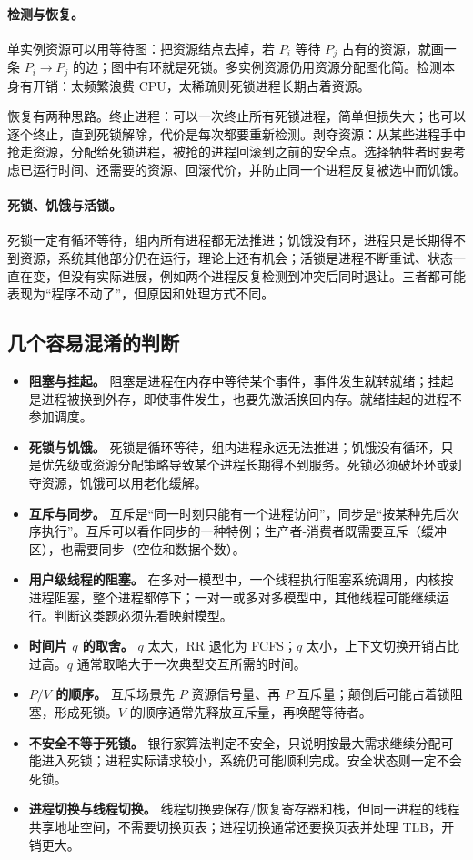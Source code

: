 \paragraph{检测与恢复。} 单实例资源可以用等待图：把资源结点去掉，若 $P_i$ 等待 $P_j$ 占有的资源，就画一条 $P_i\to P_j$ 的边；图中有环就是死锁。多实例资源仍用资源分配图化简。检测本身有开销：太频繁浪费 CPU，太稀疏则死锁进程长期占着资源。

恢复有两种思路。终止进程：可以一次终止所有死锁进程，简单但损失大；也可以逐个终止，直到死锁解除，代价是每次都要重新检测。剥夺资源：从某些进程手中抢走资源，分配给死锁进程，被抢的进程回滚到之前的安全点。选择牺牲者时要考虑已运行时间、还需要的资源、回滚代价，并防止同一个进程反复被选中而饥饿。

\paragraph{死锁、饥饿与活锁。} 死锁一定有循环等待，组内所有进程都无法推进；饥饿没有环，进程只是长期得不到资源，系统其他部分仍在运行，理论上还有机会；活锁是进程不断重试、状态一直在变，但没有实际进展，例如两个进程反复检测到冲突后同时退让。三者都可能表现为“程序不动了”，但原因和处理方式不同。

\subsection{几个容易混淆的判断}

\begin{itemize}
  \item \textbf{阻塞与挂起。} 阻塞是进程在内存中等待某个事件，事件发生就转就绪；挂起是进程被换到外存，即使事件发生，也要先激活换回内存。就绪挂起的进程不参加调度。
  \item \textbf{死锁与饥饿。} 死锁是循环等待，组内进程永远无法推进；饥饿没有循环，只是优先级或资源分配策略导致某个进程长期得不到服务。死锁必须破坏环或剥夺资源，饥饿可以用老化缓解。
  \item \textbf{互斥与同步。} 互斥是“同一时刻只能有一个进程访问”，同步是“按某种先后次序执行”。互斥可以看作同步的一种特例；生产者-消费者既需要互斥（缓冲区），也需要同步（空位和数据个数）。
  \item \textbf{用户级线程的阻塞。} 在多对一模型中，一个线程执行阻塞系统调用，内核按进程阻塞，整个进程都停下；一对一或多对多模型中，其他线程可能继续运行。判断这类题必须先看映射模型。
  \item \textbf{时间片 $q$ 的取舍。} $q$ 太大，RR 退化为 FCFS；$q$ 太小，上下文切换开销占比过高。$q$ 通常取略大于一次典型交互所需的时间。
  \item \textbf{$P/V$ 的顺序。} 互斥场景先 $P$ 资源信号量、再 $P$ 互斥量；颠倒后可能占着锁阻塞，形成死锁。$V$ 的顺序通常先释放互斥量，再唤醒等待者。
  \item \textbf{不安全不等于死锁。} 银行家算法判定不安全，只说明按最大需求继续分配可能进入死锁；进程实际请求较小，系统仍可能顺利完成。安全状态则一定不会死锁。
  \item \textbf{进程切换与线程切换。} 线程切换要保存/恢复寄存器和栈，但同一进程的线程共享地址空间，不需要切换页表；进程切换通常还要换页表并处理 TLB，开销更大。
\end{itemize}

\newpage

